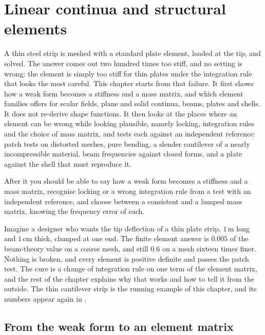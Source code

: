 \chapter{Linear continua and structural elements}\label{ch:elem}

\begin{tcolorbox}[colback=hpale,colframe=hnavy!60,coltitle=white,colbacktitle=hnavy!85,title={In this chapter}]
A thin steel strip is meshed with a standard plate element, loaded at the tip, and solved. The answer comes out two hundred times too stiff, and no setting is wrong: the element is simply too stiff for thin plates under the integration rule that looks the most careful. This chapter starts from that failure. It first shows how a weak form becomes a stiffness and a mass matrix, and which element families \fea{} offers for scalar fields, plane and solid continua, beams, plates and shells. It does not re-derive shape functions. It then looks at the places where an element can be wrong while looking plausible, namely locking, integration rules and the choice of mass matrix, and tests each against an independent reference: patch tests on distorted meshes, pure bending, a slender cantilever of a nearly incompressible material, beam frequencies against closed forms, and a plate against the shell that must reproduce it.\par\smallskip
After it you should be able to say how a weak form becomes a stiffness and a mass matrix, recognise locking or a wrong integration rule from a test with an independent reference, and choose between a consistent and a lumped mass matrix, knowing the frequency error of each.
\end{tcolorbox}

Imagine a designer who wants the tip deflection of a thin plate strip, $1\,\mathrm{m}$ long and $1\,\mathrm{cm}$ thick, clamped at one end. The finite element answer is $0.005$ of the beam-theory value on a coarse mesh, and still $0.6$ on a mesh sixteen times finer. Nothing is broken, and every element is positive definite and passes the patch test. The cure is a change of integration rule on one term of the element matrix, and the rest of the chapter explains why that works and how to tell it from the outside. The thin cantilever strip is the running example of this chapter, and its numbers appear again in .

\section{From the weak form to an element matrix}\label{sec:el-weak}

